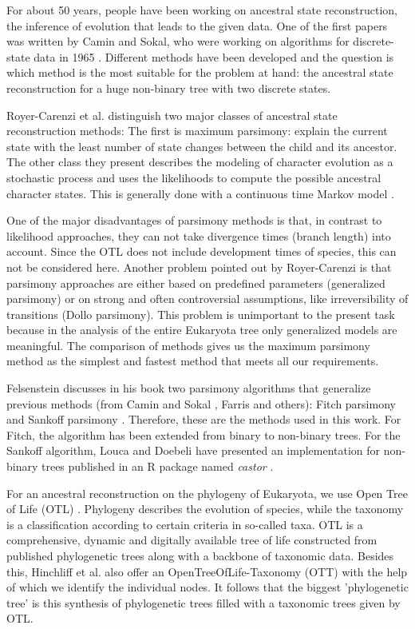   For about 50 years, people have been working on ancestral state reconstruction, the inference of 
    evolution that leads to the given data. One of the first papers was written by Camin and Sokal, 
    who were working on algorithms for discrete-state data in 1965 \cite{Camin1965}. Different 
    methods have been developed and the question is which method is the most suitable for the 
    problem at hand: the ancestral state reconstruction for a huge non-binary tree with two discrete 
    states.

  Royer-Carenzi et al. distinguish two major classes of ancestral state reconstruction methods: The
    first is maximum parsimony: explain the current state with the least number of state changes 
    between the child and its ancestor. The other class they present describes the modeling of 
    character evolution as a stochastic process and uses the likelihoods to compute the possible 
    ancestral character states. This is generally done with a continuous time Markov model 
    \cite{RoyerCarenzi2013}.

  One of the major disadvantages of parsimony methods is that, in contrast to likelihood approaches, 
    they can not take divergence times (branch length) into account. Since the OTL does not include 
    development times of species, this can not be considered here. Another problem pointed out by 
    Royer-Carenzi is that parsimony approaches are either based on predefined parameters 
    (generalized parsimony) or on strong and often controversial assumptions, like irreversibility 
    of transitions (Dollo parsimony). This problem is unimportant to the present task because in the 
    analysis of the entire Eukaryota tree only generalized models are meaningful. The comparison of 
    methods gives us the maximum parsimony method as the simplest and fastest method that meets all 
    our requirements.

  Felsenstein \cite{Felsenstein2003} discusses in his book two parsimony algorithms that generalize 
    previous methods (from Camin and Sokal \cite{Camin1965}, Farris \cite{Farris1970} and others): 
    Fitch parsimony \cite{Fitch1971} and Sankoff parsimony \cite{Sankoff1975}. Therefore, these are 
    the methods used in this work. For Fitch, the algorithm has been extended from binary to 
    non-binary trees. For the Sankoff algorithm, Louca and Doebeli have presented an implementation 
    for non-binary trees published in an R package named \textit{castor} \cite{Louca2017}.

  For an ancestral reconstruction on the phylogeny of Eukaryota, we use Open Tree of Life (OTL) 
    \cite{Hinchliff2015}. Phylogeny describes the evolution of species, while the taxonomy is a 
    classification according to certain criteria in so-called taxa. OTL is a comprehensive, dynamic 
    and digitally available tree of life constructed from published phylogenetic trees along with a 
    backbone of taxonomic data. Besides this, Hinchliff et al. also offer an OpenTreeOfLife-Taxonomy 
    (OTT) with the help of which we identify the individual nodes. It follows that the biggest 
    'phylogenetic tree' is this synthesis of phylogenetic trees filled with a taxonomic trees given 
    by OTL.

